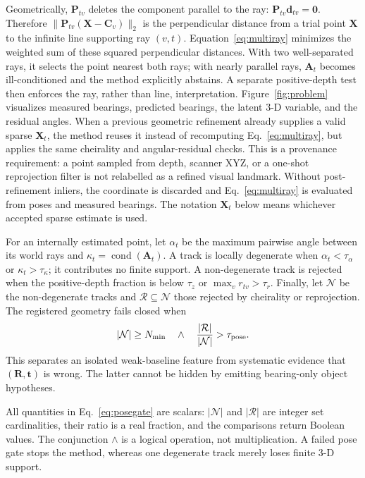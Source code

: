\documentclass[a4paper,9pt]{extarticle}
\begin{document}
Geometrically, $\mathbf P_{tv}$ deletes the component parallel to the ray:
$\mathbf P_{tv}\mathbf d_{tv}=\mathbf0$. Therefore
$\|\mathbf P_{tv}(\mathbf X-\mathbf C_v)\|_2$ is the perpendicular distance
from a trial point $\mathbf X$ to the infinite line supporting ray $(v,t)$.
Equation~\ref{eq:multiray}
minimizes the weighted sum of these squared perpendicular distances. With two
well-separated rays, it selects the point nearest both rays; with nearly
parallel rays, $\mathbf A_t$ becomes ill-conditioned and the method explicitly
abstains. A separate positive-depth test then enforces the ray, rather than
line, interpretation. Figure~\ref{fig:problem} visualizes measured bearings, predicted
bearings, the latent 3-D variable, and the residual angles.
When a previous geometric refinement already supplies a valid sparse $\mathbf X_t$, the method reuses it instead of recomputing Eq.~\ref{eq:multiray}, but applies the same cheirality and angular-residual checks. This is a provenance requirement: a point sampled from depth, scanner XYZ, or a one-shot reprojection filter is not relabelled as a refined visual landmark. Without post-refinement inliers, the coordinate is discarded and Eq.~\ref{eq:multiray} is evaluated from poses and measured bearings. The notation $\mathbf X_t$ below means whichever accepted sparse estimate is used.

For an internally estimated point, let $\alpha_t$ be the maximum pairwise angle between its world rays and $\kappa_t=\operatorname{cond}(\mathbf A_t)$. A track is locally degenerate when $\alpha_t<\tau_\alpha$ or $\kappa_t>\tau_\kappa$; it contributes no finite support. A non-degenerate track is rejected when the positive-depth fraction is below $\tau_z$ or $\max_v r_{tv}>\tau_r$. Finally, let $\mathcal N$ be the non-degenerate tracks and $\mathcal R\subseteq\mathcal N$ those rejected by cheirality or reprojection. The registered geometry fails closed when
\begin{equation}
 |\mathcal N|\ge N_{\min}
 \quad\wedge\quad
 \frac{|\mathcal R|}{|\mathcal N|}>\tau_{\rm pose}.
 \label{eq:posegate}
\end{equation}
This separates an isolated weak-baseline feature from systematic evidence that $(\mathbf R,\mathbf t)$ is wrong. The latter cannot be hidden by emitting bearing-only object hypotheses.

All quantities in Eq.~\ref{eq:posegate} are scalars: $|\mathcal N|$ and
$|\mathcal R|$ are integer set cardinalities, their ratio is a real fraction,
and the comparisons return Boolean values. The conjunction $\wedge$ is a
logical operation, not multiplication. A failed pose gate stops the method,
whereas one degenerate track merely loses finite 3-D support.
\end{document}
